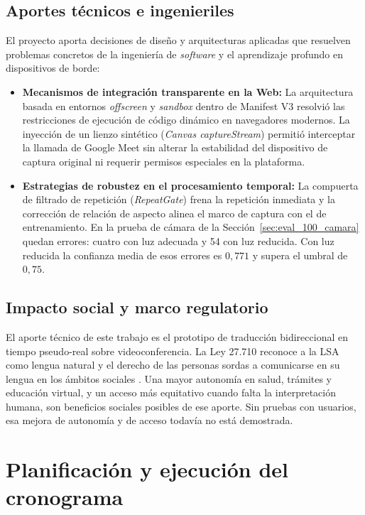\subsection{Aportes técnicos e ingenieriles}

El proyecto aporta decisiones de diseño y arquitecturas aplicadas que resuelven problemas concretos de la ingeniería de \textit{software} y el aprendizaje profundo en dispositivos de borde:

\begin{itemize}
    \item \textbf{Mecanismos de integración transparente en la Web:} La arquitectura basada en entornos \textit{offscreen} y \textit{sandbox} dentro de Manifest V3 resolvió las restricciones de ejecución de código dinámico en navegadores modernos. La inyección de un lienzo sintético (\textit{Canvas captureStream}) permitió interceptar la llamada de Google Meet sin alterar la estabilidad del dispositivo de captura original ni requerir permisos especiales en la plataforma.
    \item \textbf{Estrategias de robustez en el procesamiento temporal:} La compuerta de filtrado de repetición (\textit{RepeatGate}) frena la repetición inmediata y la corrección de relación de aspecto alinea el marco de captura con el de entrenamiento. En la prueba de cámara de la Sección~\ref{sec:eval_100_camara} quedan errores: cuatro con luz adecuada y 54 con luz reducida. Con luz reducida la confianza media de esos errores es $0{,}771$ y supera el umbral de $0{,}75$.
\end{itemize}

\subsection{Impacto social y marco regulatorio}

El aporte técnico de este trabajo es el prototipo de traducción bidireccional en tiempo pseudo-real sobre videoconferencia. La Ley 27.710 reconoce a la LSA como lengua natural y el derecho de las personas sordas a comunicarse en su lengua en los ámbitos sociales \parencite{argentina2023ley27710}. Una mayor autonomía en salud, trámites y educación virtual, y un acceso más equitativo cuando falta la interpretación humana, son beneficios sociales posibles de ese aporte. Sin pruebas con usuarios, esa mejora de autonomía y de acceso todavía no está demostrada.

\section{Planificación y ejecución del cronograma}
\label{sec:cronograma}

